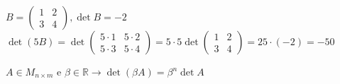 \begin{proposizione}
\begin{corollario}
      $B=
      \begin{pmatrix}
        1 & 2\\
        3 & 4
      \end{pmatrix}, \det B=-2$\\
      $\det(5B)=\det
      \begin{pmatrix}
        5\cdot 1 & 5\cdot 2\\
        5\cdot 3 & 5\cdot 4
      \end{pmatrix}=5\cdot 5\det
      \begin{pmatrix}
        1 & 2\\
        3 & 4
      \end{pmatrix}=25\cdot(-2)=-50$
    \end{corollario}
    \begin{corollario}
      $A\in M_{n\times m}$ e
      $\beta\in\mathbb{R}\longrightarrow\det(\beta A)=\beta^n\det A$
    \end{corollario}
  \end{proposizione}

  \newpage

